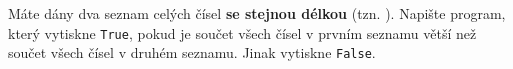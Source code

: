 \question[50]
Máte dány dva seznam celých čísel \textbf{se stejnou délkou} (tzn. ). Napište program, který
vytiskne \texttt{True}, pokud je součet všech čísel v prvním seznamu větší než
součet všech čísel v druhém seznamu. Jinak vytiskne \texttt{False}.